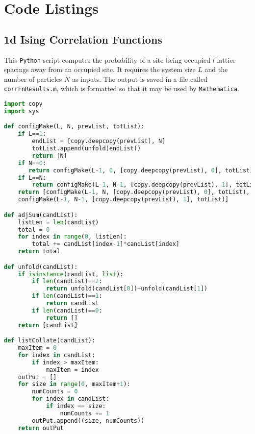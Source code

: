 \chapter{Code Listings}

\section{1d Ising Correlation Functions \label{sec:corrFnCode} }

This \texttt{Python} script computes the probability of a site being occupied $l$ lattice spacings away from an occupied site.
It requires the system size $L$ and the number of particles $N$ as inputs. The output is saved in a file called \texttt{corrFnResults.m}, which is formatted so that it may be used by \texttt{Mathematica}.

\begin{lstlisting}[language=Python]
import copy
import sys

def configMake(L, N, prevList, totList):
    if L==1:
        endList = [copy.deepcopy(prevList), N]
        totList.append(unfold(endList))
        return [N]
    if N==0:
       return configMake(L-1, 0, [copy.deepcopy(prevList), 0], totList)
    if L==N:
        return configMake(L-1, N-1, [copy.deepcopy(prevList), 1], totList)
    return [configMake(L-1, N, [copy.deepcopy(prevList), 0], totList),
    configMake(L-1, N-1, [copy.deepcopy(prevList), 1], totList)]

def adjSum(candList):
    listLen = len(candList)
    total = 0
    for index in range(0, listLen):
        total += candList[index-1]*candList[index]
    return total

def unfold(candList):
    if isinstance(candList, list):
        if len(candList)==2:
            return unfold(candList[0])+unfold(candList[1])
        if len(candList)==1:
            return candList
        if len(candList)==0:
            return []
    return [candList]

def listCollate(candList):
    maxItem = 0
    for index in candList:
        if index > maxItem:
            maxItem = index
    outPut = []
    for size in range(0, maxItem+1):
        numCounts = 0
        for index in candList:
            if index == size:
                numCounts += 1
        outPut.append((size, numCounts))
    return outPut


\end{lstlisting}
